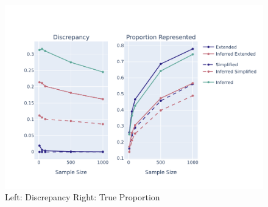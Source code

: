 \documentclass[10pt,twoside,lineno]{gsajnl}
\begin{document}


%

\begin{figure}
	\begin{center}
		\includegraphics[width=0.9\linewidth]{newplots_wo_ee/discrepancy_over_sample_5e7_new.pdf}
		\caption{Left: Discrepancy \newline Right: True Proportion }
	\end{center}
	\label{fig:discrepancy-over-sample}
\end{figure}
\end{document}
